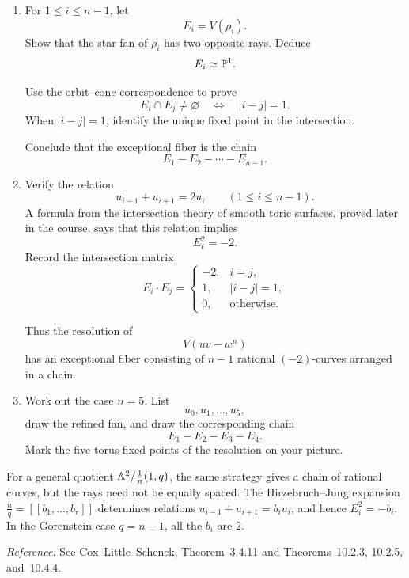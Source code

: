 \begin{enumerate}[label=\textbf{Hint \arabic*.},wide=0pt]
Explain how the refinement can be built by inserting
\[
\rho_1,\rho_2,\ldots,\rho_{n-1}
\]
one at a time. Interpret \(\pi\) as a sequence of toric weighted
blowups of torus-fixed points.

\item For \(1\leq i\leq n-1\), let
\[
E_i=V(\rho_i).
\]
Show that the star fan of \(\rho_i\) has two opposite rays. Deduce
\[
E_i\simeq\mathbb{P}^1.
\]

Use the orbit--cone correspondence to prove
\[
E_i\cap E_j\neq\varnothing
\quad\Longleftrightarrow\quad
|i-j|=1.
\]
When \(|i-j|=1\), identify the unique fixed point in the
intersection.

Conclude that the exceptional fiber is the chain
\[
E_1-E_2-\cdots-E_{n-1}.
\]

\item Verify the relation
\[
u_{i-1}+u_{i+1}=2u_i
\qquad
(1\leq i\leq n-1).
\]
A formula from the intersection theory of smooth toric surfaces,
proved later in the course, says that this relation implies
\[
E_i^2=-2.
\]
Record the intersection matrix
\[
E_i\cdot E_j
=
\begin{cases}
-2,&i=j,\\
1,&|i-j|=1,\\
0,&\text{otherwise}.
\end{cases}
\]

Thus the resolution of
\[
V(uv-w^n)
\]
has an exceptional fiber consisting of \(n-1\) rational
\((-2)\)-curves arranged in a chain.

\item Work out the case \(n=5\). List
\[
u_0,u_1,\ldots,u_5,
\]
draw the refined fan, and draw the corresponding chain
\[
E_1-E_2-E_3-E_4.
\]
Mark the five torus-fixed points of the resolution on your picture.
\end{enumerate}

\begin{tcolorbox}[
  colback=PredictionTeal!5,
  colframe=PredictionTeal,
  title={Beyond the Gorenstein case},
  fonttitle=\bfseries
]
For a general quotient
\(\mathbb{A}^2/\tfrac1n(1,q)\), the same strategy gives a chain of rational
curves, but the rays need not be equally spaced. The
Hirzebruch--Jung expansion
\(\frac nq=[\![b_1,\ldots,b_r]\!]\) determines relations
\(u_{i-1}+u_{i+1}=b_i u_i\), and hence
\(E_i^2=-b_i\). In the Gorenstein case \(q=n-1\), all the \(b_i\) are
\(2\).
\end{tcolorbox}

\noindent
\textit{Reference.}
See Cox--Little--Schenck, Theorem~3.4.11 and
Theorems~10.2.3, 10.2.5, and~10.4.4.


